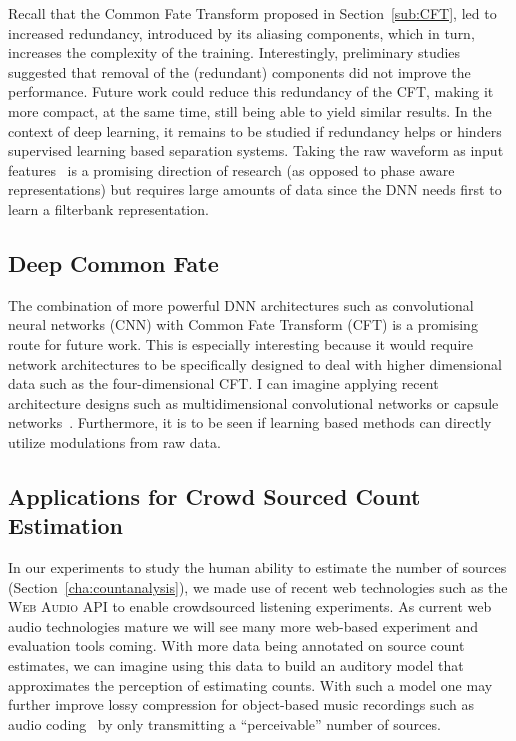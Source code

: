 Recall that the Common Fate Transform proposed in Section~\ref{sub:CFT}, led to increased redundancy, introduced by its aliasing components, which in turn, increases the complexity of the training.
Interestingly, preliminary studies suggested that removal of the (redundant) components did not improve the performance.
Future work could reduce this redundancy of the CFT, making it more compact, at the same time, still being able to yield similar results.
In the context of deep learning, it remains to be studied if redundancy helps or hinders supervised learning based separation systems.
Taking the raw waveform as input features~\cite{Dieleman14, oord16} is a promising direction of research (as opposed to phase aware representations) but requires large amounts of data since the DNN needs first to learn a filterbank representation.

\subsection*{Deep Common Fate}

The combination of more powerful DNN architectures such as convolutional neural networks (CNN) with Common Fate Transform (CFT) is a promising route for future work. 
This is especially interesting because it would require network architectures to be specifically designed to deal with higher dimensional data such as the four-dimensional CFT. I can imagine applying recent architecture designs such as multidimensional convolutional networks or capsule networks~\cite{sabour17}. 
Furthermore, it is to be seen if learning based methods can directly utilize modulations from raw data.

\subsection*{Applications for Crowd Sourced Count Estimation}

In our experiments to study the human ability to estimate the number of sources (Section~\ref{cha:countanalysis}), we made use of recent web technologies such as the \textsc{Web Audio API} to enable crowdsourced listening experiments. As current web audio technologies mature we will see many more web-based experiment and evaluation tools coming.
With more data being annotated on source count estimates, we can imagine using this data to build an auditory model that approximates the perception of estimating counts.
With such a model one may further improve lossy compression for object-based music recordings such as audio coding~\cite{herre12} by only transmitting a ``perceivable'' number of sources.

